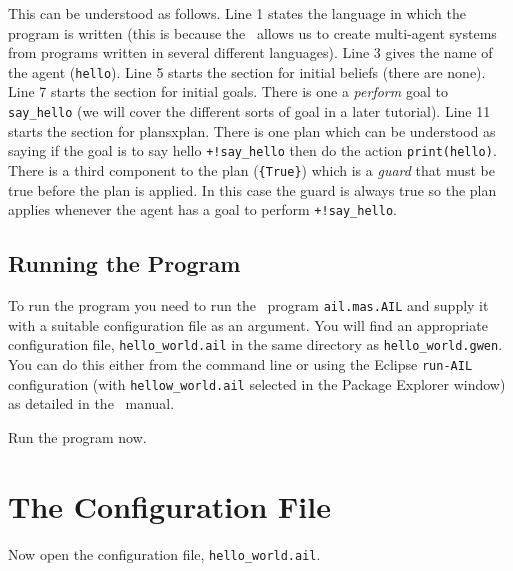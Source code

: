This can be understood as follows.  Line 1 states the language in which the program is written (this is because the \ail\ allows us to create multi-agent systems from programs written in several different languages).  Line 3 gives the name of the agent (\lstinline{hello}).  Line 5 starts the section for initial beliefs (there are none).  Line 7 starts the section for initial goals.  There is one a \emph{perform} goal to \lstinline{say_hello} (we will cover the different sorts of goal in a later tutorial).  Line 11 starts the section for plansx{plan}.  There is one plan which can be understood as saying if the goal is to say hello \lstinline{+!say_hello} then do the action \lstinline{print(hello)}.  There is a third component to the plan (\lstinline+{True}+) which is a \emph{guard} that must be true before the plan is applied.  In this case the guard is always true so the plan applies whenever the agent has a goal to perform \lstinline{+!say_hello}.

\subsection{Running the Program}

To run the program you need to run the \java\ program \texttt{ail.mas.AIL} and supply it with a suitable configuration file as an argument.  You will find an appropriate configuration file, \texttt{hello\_world.ail} in the same directory as \texttt{hello\_world.gwen}.  You can do this either from the command line or using the Eclipse \texttt{run-AIL} configuration (with \texttt{hellow\_world.ail} selected in the Package Explorer window) as detailed in the \mcapl\ manual.

Run the program now.

\section{The Configuration File}
Now open the configuration file, \texttt{hello\_world.ail}.

